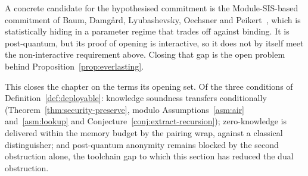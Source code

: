 A concrete candidate for the hypothesised commitment is the Module-{SIS}-based commitment of Baum, Damg{\aa}rd, Lyubashevsky, Oechsner and Peikert~\cite{bdlop2018}, which is statistically hiding in a parameter regime that trades off against binding. It is post-quantum, but its proof of opening is interactive, so it does not by itself meet the non-interactive requirement above. Closing that gap is the open problem behind Proposition~\ref{prop:everlasting}.

This closes the chapter on the terms its opening set. Of the three conditions of Definition~\ref{def:deployable}: knowledge soundness transfers conditionally (Theorem~\ref{thm:security-preserve}, modulo Assumptions~\ref{asm:air} and~\ref{asm:lookup} and Conjecture~\ref{conj:extract-recursion}); zero-knowledge is delivered within the memory budget by the pairing wrap, against a classical distinguisher; and post-quantum anonymity remains blocked by the second obstruction alone, the toolchain gap to which this section has reduced the dual obstruction.
